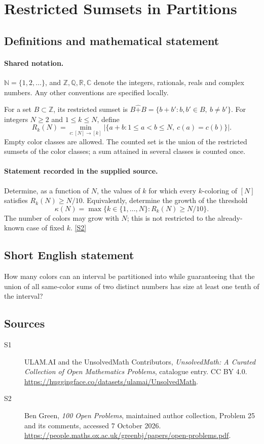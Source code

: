\documentclass[11pt]{article}
\newcommand{\sref}[2]{\hyperlink{source:#1:#2}{[S#2]}}
\begin{document}
\section{Restricted Sumsets in Partitions}\label{statement}

\subsection{Definitions and mathematical statement}

\paragraph{Shared notation.}$\mathbb N=\{1,2,\ldots\}$, and $\mathbb Z,\mathbb Q,\mathbb R,\mathbb C$ denote the integers, rationals, reals and complex numbers. Any other conventions are specified locally.


For a set $B\subset\mathbb Z$, its restricted sumset is $B\widehat{+}B=\{b+b':b,b'\in B,\ b\ne b'\}$. For integers $N\geq2$ and $1\leq k\leq N$, define
\[
 R_k(N)=\min_{c:[N]\to[k]}
 \bigl|\{a+b:1\leq a<b\leq N,\ c(a)=c(b)\}\bigr|.
\]
Empty color classes are allowed. The counted set is the union of the restricted sumsets of the color classes; a sum attained in several classes is counted once.
\paragraph{Statement recorded in the supplied source.}
Determine, as a function of $N$, the values of $k$ for which every $k$-coloring of $[N]$ satisfies $R_k(N)\geq N/10$. Equivalently, determine the growth of the threshold
\[
 \kappa(N)=\max\{k\in\{1,\ldots,N\}:R_k(N)\geq N/10\}.
\]
The number of colors may grow with $N$; this is not restricted to the already-known case of fixed $k$. \sref{statement}{2}
\subsection{Short English statement}
How many colors can an interval be partitioned into while guaranteeing that the union of all same-color sums of two distinct numbers has size at least one tenth of the interval?
\subsection{Sources}
\begin{description}
\item[\hypertarget{source:statement:1}{S1}] ULAM.AI and the UnsolvedMath Contributors, \emph{UnsolvedMath: A Curated Collection of Open Mathematics Problems}, catalogue entry. CC BY 4.0. \url{https://huggingface.co/datasets/ulamai/UnsolvedMath}.
\item[\hypertarget{source:statement:2}{S2}] Ben Green, \emph{100 Open Problems}, maintained author collection, Problem 25 and its comments, accessed 7 October 2026. \url{https://people.maths.ox.ac.uk/greenbj/papers/open-problems.pdf}.
\end{description}
\label{end:statement}
\end{document}
